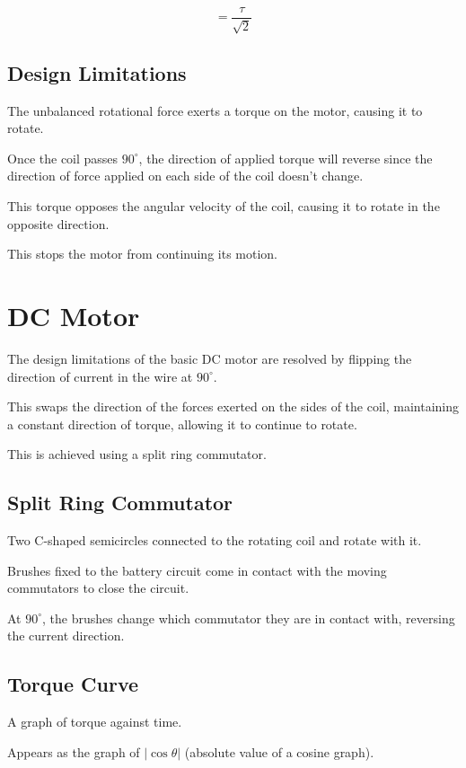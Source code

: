 \documentclass[a4paper,11pt]{report}
\begin{document}
$$
= \frac{\tau}{\sqrt{2}}
$$

\subsection{Design Limitations}

The unbalanced rotational force exerts a torque on the motor, causing it to
rotate.

Once the coil passes $90^\circ$, the direction of applied torque will reverse
since the direction of force applied on each side of the coil doesn't change.

This torque opposes the angular velocity of the coil, causing it to rotate in
the opposite direction.

This stops the motor from continuing its motion.


\section{DC Motor}

The design limitations of the basic DC motor are resolved by flipping the
direction of current in the wire at $90^\circ$.

This swaps the direction of the forces exerted on the sides of the coil,
maintaining a constant direction of torque, allowing it to continue to rotate.

This is achieved using a split ring commutator.

\subsection{Split Ring Commutator}

Two C-shaped semicircles connected to the rotating coil and rotate with it.

Brushes fixed to the battery circuit come in contact with the moving commutators
to close the circuit.

At $90^\circ$, the brushes change which commutator they are in contact with,
reversing the current direction.

\subsection{Torque Curve}

A graph of torque against time.

Appears as the graph of $\lvert \cos{\theta} \rvert$ (absolute value of a
cosine graph).
\end{document}
